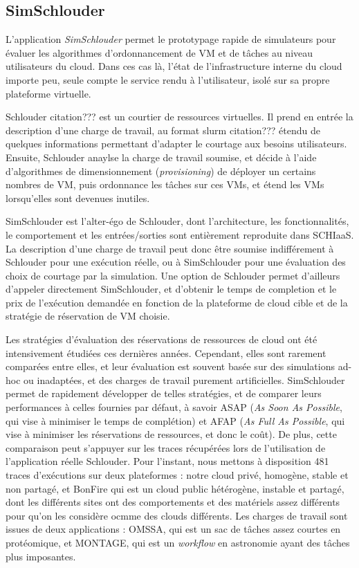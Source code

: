 \documentclass[parallelisme]{compas2017}
\begin{document}
\subsection{SimSchlouder}

L'application \emph{SimSchlouder} permet le prototypage rapide de simulateurs pour évaluer les 
algorithmes d'ordonnancement de VM et de tâches au niveau utilisateurs du cloud. 
Dans ces cas là, l'état de l'infrastructure interne du cloud importe peu, seule compte le service 
rendu à l'utilisateur, isolé sur sa propre plateforme virtuelle. 

Schlouder citation??? est un courtier de ressources virtuelles. Il prend en entrée la description 
d'une charge de travail, au format slurm citation??? étendu de quelques informations permettant 
d'adapter le courtage aux besoins utilisateurs. Ensuite, Schlouder anaylse la charge de travail 
soumise, et décide à l'aide d'algorithmes de dimensionnement (\textit{provisioning}) de déployer 
un certains nombres de VM, puis ordonnance les tâches sur ces VMs, et étend les VMs lorsqu'elles
sont devenues inutiles.

SimSchlouder est l'alter-égo de Schlouder, dont l'architecture, les fonctionnalités, le comportement
et les entrées/sorties sont entièrement reproduite dans SCHIaaS. La description d'une charge de 
travail peut donc être soumise indifférement à Schlouder pour une exécution réelle, ou à SimSchlouder
pour une évaluation des choix de courtage par la simulation. Une option de Schlouder permet 
d'ailleurs d'appeler directement SimSchlouder, et d'obtenir le temps de completion et le prix 
de l'exécution demandée en fonction de la plateforme de cloud cible et de la stratégie de réservation
de VM choisie.

Les stratégies d'évaluation des réservations de ressources de cloud ont été intensivement étudiées 
ces dernières années. Cependant, elles sont rarement comparées entre elles, et leur évaluation 
est souvent basée sur des simulations ad-hoc ou inadaptées, et des charges de travail purement artificielles.
SimSchlouder permet de rapidement développer de telles stratégies, et de comparer leurs performances 
à celles fournies par défaut, à savoir ASAP (\textit{As Soon As Possible}, qui vise à minimiser le temps de 
complétion) et AFAP (\textit{As Full As Possible}, qui vise à minimiser les réservations de ressources,
et donc le coût). De plus, cette comparaison peut s'appuyer sur les traces récupérées lors de l'utilisation 
de l'application réelle Schlouder. Pour l'instant, nous mettons à disposition 481 traces d'exécutions
sur deux plateformes : notre cloud privé, homogène, stable et non partagé, et BonFire qui est un cloud 
public hétérogène, instable et partagé, dont les différents sites ont des comportements et des matériels 
assez différents pour qu'on les considère ocmme des clouds différents.
Les charges de travail sont issues de deux applications : OMSSA, qui est un sac de tâches assez courtes 
en protéomique, et MONTAGE, qui est un \textit{workflow} en astronomie ayant des tâches plus imposantes. 
\end{document}
